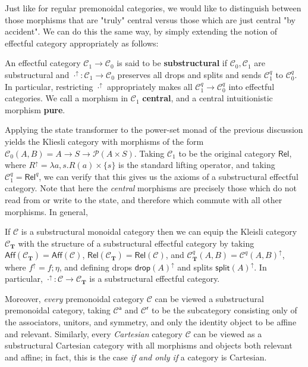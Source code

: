 \documentclass[acmsmall,screen,review]{acmart}
\newcommand{\mc}[1]{\ensuremath{\mathcal{#1}}}
\newcommand{\mb}[1]{\ensuremath{\mathbf{#1}}}
\newcommand{\ms}[1]{\ensuremath{\mathsf{#1}}}
\newcommand{\upg}[2]{{#1}^{\uparrow #2}}
\begin{document}
Just like for regular premonoidal categories, we would like to distinguish
between those morphisms that are "truly" central versus those which are just
central "by accident". We can do this the same way, by simply extending the
notion of effectful category appropriately as follows:
\begin{definition}
  An effectful category \(\mc{C}_1 \to \mc{C}_0\) is said to be
  \textbf{substructural} if \(\mc{C}_0, \mc{C}_1\) are substructural and
  \(\upg{\cdot}{}: \mc{C}_1 \to \mc{C}_0\) preserves all drops and splits and
  sends \(\mc{C}_1^q\) to \(\mc{C}_0^q\). In particular, restricting
  \(\upg{\cdot}{}\) appropriately makes all \(\mc{C}_1^q \to \mc{C}_0^q\) into
  effectful categories.  We call a morphism in \(\mc{C}_1\) \textbf{central},
  and a central intuitionistic morphism \textbf{pure}.
\end{definition}
Applying the state transformer to the power-set monad of the previous discussion
yields the Kliesli category with morphisms of the form \(\mc{C}_0(A, B) = A \to
S \to \mc{P}(A \times S)\). Taking \(\mc{C}_1\) to be the original category
\(\ms{Rel}\), where \(\upg{R}{} = \lambda a, s. R(a) \times \{s\}\) is the
standard lifting operator, and taking \(\mc{C}_1^q = \ms{Rel}^q\), we can verify
that this gives us the axioms of a substructural effectful category. Note that
here the \textit{central} morphisms are precisely those which do not read from
or write to the state, and therefore which commute with all other morphisms. In
general,
\begin{proposition}
  If \(\mc{C}\) is a substructural monoidal category then we can equip the
  Kleisli category \(\mc{C}_{\mb{T}}\) with the structure of a substructural
  effectful category by taking \(\ms{Aff}(\mc{C}_{\mb{T}}) = \ms{Aff}(\mc{C})\),
  \(\ms{Rel}(\mc{C}_{\mb{T}}) = \ms{Rel}(\mc{C})\), and \(\mc{C}_{\mb{T}}^q(A,
  B) = \upg{\mc{C}^q(A, B)}{}\), where \(\upg{f}{} = f;\eta\), and defining
  drops \(\upg{\ms{drop}(A)}{}\) and splits \(\upg{\ms{split}(A)}{}\). In
  particular, \(\upg{\cdot}{}: \mc{C} \to \mc{C}_{\mb{T}}\) is a substructural
  effectful category.
\end{proposition}
Moreover, \textit{every} premonoidal category \(\mc{C}\) can be viewed a
substructural premonoidal category, taking \(\mc{C}^{\ms{a}}\) and
\(\mc{C}^{\ms{r}}\) to be the subcategory consisting only of the associators,
unitors, and symmetry, and only the identity object to be affine and relevant.
Similarly, every \textit{Cartesian} category \(\mc{C}\) can be viewed as a
substructural Cartesian category with all morphisms and objects both relevant
and affine; in fact, this is the case \textit{if and only if} a category is
Cartesian.
\end{document}
